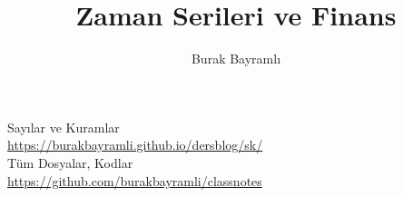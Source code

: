 \documentclass[12pt,a4paper]{report}
\title{Zaman Serileri ve Finans}
\author{Burak Bayramlı}
\date{}
\begin{document}
\maketitle

\newpage

\vspace*{4cm}
\begin{center}
\vspace{0.5cm}
Sayılar ve Kuramlar\\
\vspace{0.5cm}
\url{https://burakbayramli.github.io/dersblog/sk/}\\
\vspace{0.5cm}
Tüm Dosyalar, Kodlar\\
\vspace{0.5cm}
\url{https://github.com/burakbayramli/classnotes}\\
\end{center}
\end{document}
